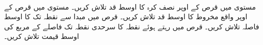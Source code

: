 \\
مستوی  میں قرص   کے اوپر نصف کرہ   کا اوسط قد تلاش کریں۔
مستوی  میں قرص  کے اوپر  واقع   مخروط   کا اوسط قد تلاش کریں۔ 
قرص  میں مبدا سے نقطہ  تک  کا  اوسط  فاصلہ تلاش کریں۔
قرص  میں  رہتے ہوئے نقطہ  کا سرحدی نقطہ   تک فاصلے کے مربع   کی اوسط  قیمت تلاش کریں۔

